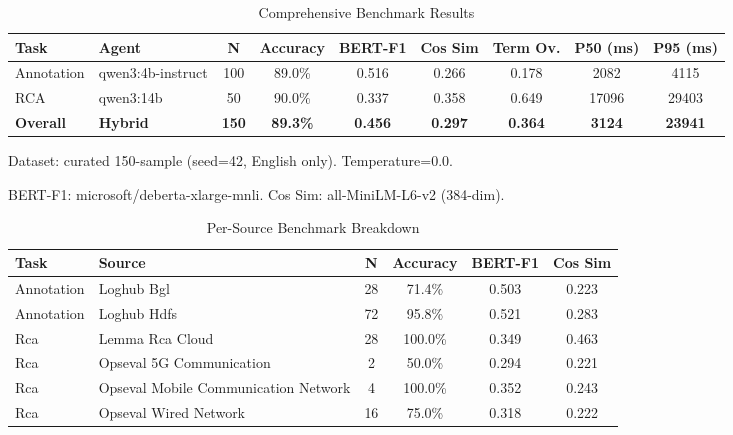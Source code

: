 
\begin{table}[h]
\centering
\caption{Comprehensive Benchmark Results}
\label{tab:comprehensive-results}
\begin{tabular}{llccccccc}
\toprule
\textbf{Task} & \textbf{Agent} & \textbf{N} & \textbf{Accuracy} & \textbf{BERT-F1} & \textbf{Cos Sim} & \textbf{Term Ov.} & \textbf{P50 (ms)} & \textbf{P95 (ms)} \\
\midrule
Annotation & qwen3:4b-instruct & 100 & 89.0\% & 0.516 & 0.266 & 0.178 & 2082 & 4115 \\
RCA & qwen3:14b & 50 & 90.0\% & 0.337 & 0.358 & 0.649 & 17096 & 29403 \\
\midrule
\textbf{Overall} & \textbf{Hybrid} & \textbf{150} & \textbf{89.3\%} & \textbf{0.456} & \textbf{0.297} & \textbf{0.364} & \textbf{3124} & \textbf{23941} \\
\bottomrule
\end{tabular}
\begin{tablenotes}
\small
\item Dataset: curated 150-sample (seed=42, English only). Temperature=0.0.
\item BERT-F1: microsoft/deberta-xlarge-mnli. Cos Sim: all-MiniLM-L6-v2 (384-dim).
\end{tablenotes}
\end{table}


\begin{table}[h]
\centering
\caption{Per-Source Benchmark Breakdown}
\label{tab:per-source}
\begin{tabular}{llcccc}
\toprule
\textbf{Task} & \textbf{Source} & \textbf{N} & \textbf{Accuracy} & \textbf{BERT-F1} & \textbf{Cos Sim} \\
\midrule
Annotation & Loghub Bgl & 28 & 71.4\% & 0.503 & 0.223 \\
Annotation & Loghub Hdfs & 72 & 95.8\% & 0.521 & 0.283 \\
Rca & Lemma Rca Cloud & 28 & 100.0\% & 0.349 & 0.463 \\
Rca & Opseval 5G Communication & 2 & 50.0\% & 0.294 & 0.221 \\
Rca & Opseval Mobile Communication Network & 4 & 100.0\% & 0.352 & 0.243 \\
Rca & Opseval Wired Network & 16 & 75.0\% & 0.318 & 0.222 \\
\bottomrule
\end{tabular}
\end{table}



